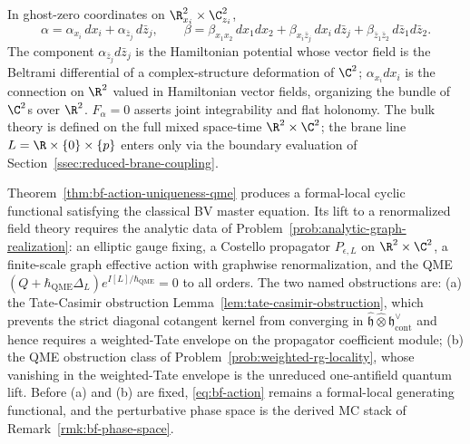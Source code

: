 \documentclass[11pt]{memoir}
\begin{document}
\begin{rmk}\label{rmk:bf-component-reading}
  In ghost-zero coordinates on $\R^2_{x_i}\times\C^2_{z_i}$,
  $$\alpha=\alpha_{x_i}\,dx_i+\alpha_{\bar z_j}\,d\bar z_j,\qquad
    \beta=\beta_{x_1x_2}\,dx_1dx_2+\beta_{x_i\bar z_j}\,dx_i\,d\bar
      z_j+\beta_{\bar z_1\bar z_2}\,d\bar z_1d\bar z_2.$$
  The component $\alpha_{\bar z_j}d\bar z_j$ is the Hamiltonian
  potential whose vector field is the Beltrami differential of a
  complex-structure deformation of $\C^2$;
  $\alpha_{x_i}dx_i$ is the connection on $\R^2$ valued in Hamiltonian
  vector fields, organizing the bundle of $\C^2$s over $\R^2$.
  $F_\alpha=0$ asserts joint integrability and flat holonomy.  The
  bulk theory is defined on the full mixed space-time
  $\R^2\times\C^2$; the brane line $L=\R\times\{0\}\times\{p\}$
  enters only via the boundary evaluation of
  Section~\ref{ssec:reduced-brane-coupling}.
\end{rmk}

\begin{rmk}\label{rmk:bf-renormalization-obstruction}
  Theorem~\ref{thm:bf-action-uniqueness-qme} produces a formal-local
  cyclic functional satisfying the classical BV master equation.  Its
  lift to a renormalized field theory requires the analytic
  data of Problem~\ref{prob:analytic-graph-realization}: an elliptic
  gauge fixing, a Costello propagator $P_{\epsilon,L}$ on
  $\R^2\times\C^2$, a finite-scale graph effective action with
  graphwise renormalization, and the QME
  \((Q+\hbar_{\mathrm{QME}}\Delta_L)e^{I[L]/\hbar_{\mathrm{QME}}}=0\)
  to all orders.  The two named
  obstructions are: (a) the Tate-Casimir obstruction
  Lemma~\ref{lem:tate-casimir-obstruction}, which prevents the strict
  diagonal cotangent kernel from converging in
  $\widehat{\mathfrak h}\widehat\otimes\mathfrak h^\vee_{\mathrm{cont}}$
  and hence requires a weighted-Tate envelope on the propagator
  coefficient module; (b) the QME obstruction class of
  Problem~\ref{prob:weighted-rg-locality}, whose vanishing in the
  weighted-Tate envelope is the unreduced one-antifield quantum lift.
  Before (a) and (b) are fixed, \eqref{eq:bf-action} remains a
  formal-local generating functional, and the perturbative phase space is the
  derived MC stack of Remark~\ref{rmk:bf-phase-space}.
\end{rmk}
\end{document}
